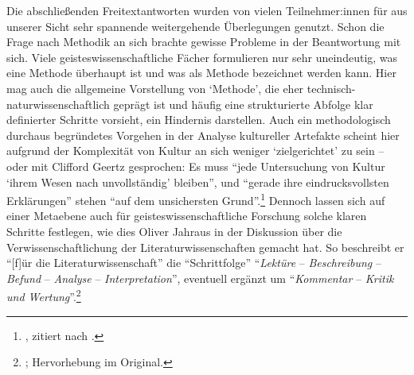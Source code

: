 \documentclass{scrartcl}
\begin{document}
Die abschließenden Freitextantworten wurden von vielen Teilnehmer:innen für aus unserer Sicht sehr spannende weitergehende Überlegungen genutzt.
Schon die Frage nach Methodik an sich brachte gewisse Probleme in der Beantwortung mit sich.
Viele geisteswissenschaftliche Fächer formulieren nur sehr uneindeutig, was eine Methode überhaupt ist und was als Methode bezeichnet werden kann.
Hier mag auch die allgemeine Vorstellung von \enquote*{Methode}, die eher technisch-naturwissenschaftlich geprägt ist und häufig eine strukturierte Abfolge klar definierter Schritte vorsieht, ein Hindernis darstellen.
Auch ein methodologisch durchaus begründetes Vorgehen in der Analyse kultureller Artefakte scheint hier aufgrund der Komplexität von Kultur an sich weniger \enquote*{zielgerichtet} zu sein -- oder mit Clifford Geertz gesprochen:
Es muss \enquote{jede Untersuchung von Kultur \enquote{ihrem Wesen nach unvollständig} bleiben}, und \enquote{gerade ihre eindrucksvollsten Erklärungen} stehen \enquote{auf dem unsichersten Grund}.\footnote{\autocite[][S.~14]{geertz_dichte_1983}, zitiert nach \autocite[][S.~10]{wirth_voruberlegungen_2007}.}
Dennoch lassen sich auf einer Metaebene auch für geisteswissenschaftliche Forschung solche klaren Schritte festlegen, wie dies Oliver Jahraus in der Diskussion über die Verwissenschaftlichung der Literaturwissenschaften gemacht hat.
So beschreibt er \enquote{[f]ür die Literaturwissenschaft} die \enquote{Schrittfolge} \enquote{\textit{Lektüre} -- \textit{Beschreibung} -- \textit{Befund} -- \textit{Analyse} -- \textit{Interpretation}}, eventuell ergänzt um \enquote{\textit{Kommentar} -- \textit{Kritik und Wertung}}.\footnote{\autocite[][S.~222]{jahraus_literaturtheorie_2004}; Hervorhebung im Original.}
\end{document}

